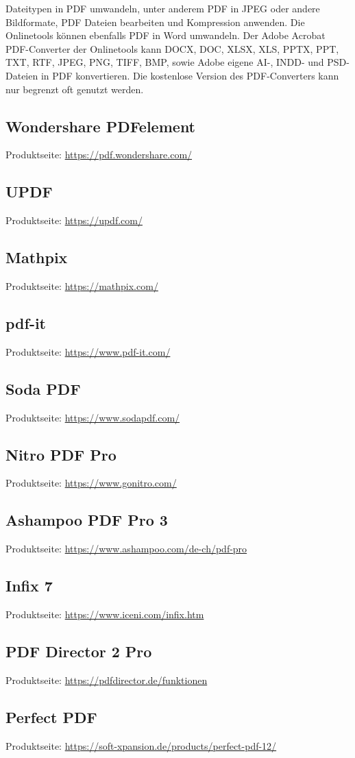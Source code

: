 Dateitypen in PDF umwandeln, unter anderem PDF in JPEG oder andere Bildformate, PDF Dateien bearbeiten und Kompression anwenden. Die Onlinetools können ebenfalls PDF in Word umwandeln. \cite{adobe-search} Der Adobe Acrobat PDF-Converter der Onlinetools kann DOCX, DOC, XLSX, XLS, PPTX, PPT, TXT, RTF, JPEG, PNG, TIFF, BMP, sowie Adobe eigene AI-, INDD- und PSD-Dateien in PDF konvertieren. \cite{adobe-formate} Die kostenlose Version des PDF-Converters kann nur begrenzt oft genutzt werden.

\subsection{Wondershare PDFelement}
Produktseite: \url{https://pdf.wondershare.com/}

\subsection{UPDF}
Produktseite: \url{https://updf.com/}

\subsection{Mathpix}
Produktseite: \url{https://mathpix.com/}



\subsection{pdf-it}
Produktseite: \url{https://www.pdf-it.com/}

\subsection{Soda PDF}
Produktseite: \url{https://www.sodapdf.com/}

\subsection{Nitro PDF Pro}
Produktseite: \url{https://www.gonitro.com/}

\subsection{Ashampoo PDF Pro 3}
Produktseite: \url{https://www.ashampoo.com/de-ch/pdf-pro}

\subsection{Infix 7}
Produktseite: \url{https://www.iceni.com/infix.htm}

\subsection{PDF Director 2 Pro}
Produktseite: \url{https://pdfdirector.de/funktionen}

\subsection{Perfect PDF}
Produktseite: \url{https://soft-xpansion.de/products/perfect-pdf-12/}